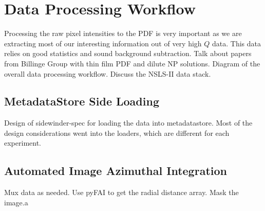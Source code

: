 \section{Data Processing Workflow}
Processing the raw pixel intensities to the PDF is very important as we are extracting most of our interesting information out of very high $Q$ data.
This data relies on good statistics and sound background subtraction.
Talk about papers from Billinge Group with thin film PDF and dilute NP solutions.
Diagram of the overall data processing workflow.
Discuss the NSLS-II data stack.
\begin{landscape}
\begin{center}
\end{center}
\end{landscape}
\subsection{MetadataStore Side Loading}
Design of sidewinder-spec for loading the data into metadatastore.
Most of the design considerations went into the loaders, which are different for each experiment.
\subsection{Automated Image Azimuthal Integration}
Mux data as needed. 
Use pyFAI to get the radial distance array.
Mask the image.a
